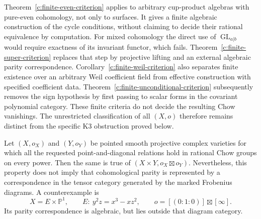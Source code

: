 \begin{remark}
\label{c:finite-criterion-scope}
Theorem~\ref{c:finite-even-criterion} applies to arbitrary cup-product
algebras with pure-even cohomology, not only to surfaces.  It gives
a finite algebraic construction of the cycle conditions, without
claiming to decide their rational equivalence by computation.
For mixed cohomology the direct use of
$\operatorname{GL}_{a|b}$ would require exactness of its invariant
functor, which fails.  Theorem~\ref{c:finite-super-criterion}
replaces that step by projective lifting and an external algebraic
parity correspondence.  Corollary~\ref{c:finite-weil-criterion}
also separates finite existence over an arbitrary Weil coefficient
field from effective construction with specified coefficient data.
Theorem~\ref{c:finite-unconditional-criterion} subsequently removes
the sign hypothesis by first passing to scalar forms in the
covariant polynomial category.  These finite criteria do not
decide the resulting Chow vanishings.
The unrestricted classification of all $(X,o)$ therefore remains
distinct from the specific K3 obstruction proved below.
\end{remark}


\begin{proposition}
\label{c:product-parity}
Let $(X,o_X)$ and $(Y,o_Y)$ be pointed smooth projective complex
varieties for which all the requested point-and-diagonal relations
hold in rational Chow groups on every power.  Then the same is
true of $(X\times Y,o_X\boxtimes o_Y)$.
Nevertheless, this property does not imply that cohomological
parity is represented by a correspondence in the tensor category
generated by the marked Frobenius diagrams.  A counterexample is
\[
 X=E\times\mathbb P^1,\qquad
 E:\ y^2z=x^3-xz^2,\qquad
 o=[(0:1:0)]\boxtimes[\infty].
\]
Its parity correspondence is algebraic, but lies outside that
diagram category.
\end{proposition}

